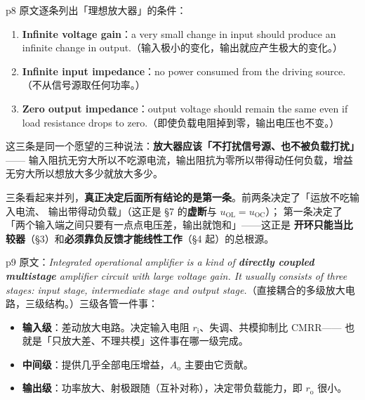 \documentclass[11pt]{ctexart}
\begin{document}


p8 原文逐条列出「理想放大器」的条件：

\begin{enumerate}
\item \textbf{Infinite voltage gain}：a very small change in input should produce an
infinite change in output.（输入极小的变化，输出就应产生极大的变化。）
\item \textbf{Infinite input impedance}：no power consumed from the driving source.
（不从信号源取任何功率。）
\item \textbf{Zero output impedance}：output voltage should remain the same even if
load resistance drops to zero.（即使负载电阻掉到零，输出电压也不变。）
\end{enumerate}

这三条是同一个愿望的三种说法：\textbf{放大器应该「不打扰信号源、也不被负载打扰」}——
输入阻抗无穷大所以不吃源电流，输出阻抗为零所以带得动任何负载，增益无穷大所以想放大多少就放大多少。

\begin{wbx}
三条看起来并列，\textbf{真正决定后面所有结论的是第一条}。前两条决定了「运放不吃输入电流、
输出带得动负载」（这正是 §7 的\textbf{虚断}与 $u_{\mathrm{OL}}=u_{\mathrm{OC}}$）；
第一条决定了「两个输入端之间只要有一点点电压差，输出就饱和」——这正是
\textbf{开环只能当比较器}（§3）和\textbf{必须靠负反馈才能线性工作}（§4 起）的总根源。
\end{wbx}


p9 原文：\textit{Integrated operational amplifier is a kind of \textbf{directly coupled multistage}
amplifier circuit with large voltage gain. It usually consists of three stages: input stage,
intermediate stage and output stage.}（直接耦合的多级放大电路，三级结构。）三级各管一件事：

\begin{itemize}
\item \textbf{输入级}：差动放大电路。决定输入电阻 $r_{\mathrm{i}}$、失调、共模抑制比 CMRR——
也就是「只放大差、不理共模」这件事在哪一级完成。
\item \textbf{中间级}：提供几乎全部电压增益，$A_{\mathrm{o}}$ 主要由它贡献。
\item \textbf{输出级}：功率放大、射极跟随（互补对称），决定带负载能力，即 $r_{\mathrm{o}}$ 很小。
\end{itemize}
\end{document}
